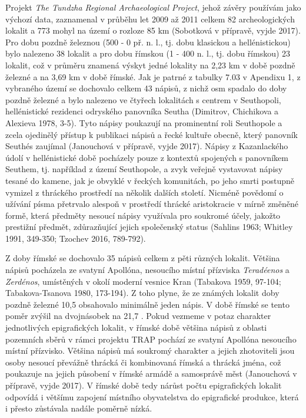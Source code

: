 Projekt {\em The Tundzha Regional Archaeological Project}, jehož závěry používám jako výchozí data, zaznamenal v průběhu let 2009 až 2011 celkem 82 archeologických lokalit a 773 mohyl na území o rozloze 85 km (Sobotková v přípravě, vyjde 2017). Pro dobu pozdně železnou (500 - 0 př. n. l., tj. dobu klasickou a hellénistickou) bylo nalezeno 38 lokalit a pro dobu římskou (1 - 400 n. l., tj. dobu římskou) 23 lokalit, což v průměru znamená výskyt jedné lokality na 2,23 km v době pozdně železné a na 3,69 km v době římské. Jak je patrné z tabulky 7.03 v Apendixu 1, z vybraného území se dochovalo celkem 43 nápisů, z nichž osm spadalo do doby pozdně železné a bylo nalezeno ve čtyřech lokalitách s centrem v Seuthopoli, hellénistické rezidenci odryského panovníka Seutha (Dimitrov, Chichikova a Alexieva 1978, 3-5). Tyto nápisy poukazují na prominentní roli Seuthopole a zcela ojedinělý přístup k publikaci nápisů a řecké kultuře obecně, který panovník Seuthés zaujímal (Janouchová v přípravě, vyjde 2017). Nápisy z Kazanlackého údolí v hellénistické době pocházely pouze z kontextů spojených s panovníkem Seuthem, tj. například z území Seuthopole, a zvyk veřejně vystavovat nápisy tesané do kamene, jak je obvyklé v řeckých komunitách, po jeho smrti postupně vymizel z thráckého prostředí na několik dalších století. Nicméně povědomí o užívání písma přetrvalo alespoň v prostředí thrácké aristokracie v mírně změněné formě, která předměty nesoucí nápisy využívala pro soukromé účely, jakožto prestižní předmět, zdůrazňující jejich společenský status (Sahlins 1963; Whitley 1991, 349-350; Tzochev 2016, 789-792).

Z doby římské se dochovalo 35 nápisů celkem z pěti různých lokalit. Většina nápisů pocházela ze svatyní Apollóna, nesoucího místní přízviska {\em Teradéenos} a {\em Zerdénos}, umístěných v okolí moderní vesnice Kran (Tabakova 1959, 97-104; Tabakova-Tsanova 1980, 173-194). Z toho plyne, že ze známých lokalit doby pozdně železné 10,5  obsahovalo minimálně jeden nápis. V době římské se tento poměr zvýšil na dvojnásobek na 21,7 . Pokud vezmeme v potaz charakter jednotlivých epigrafických lokalit, v římské době většina nápisů z oblasti pozemních sběrů v rámci projektu TRAP pochází ze svatyní Apollóna nesoucího místní přízvisko. Většina nápisů má soukromý charakter a jejich zhotoviteli jsou osoby nesoucí převážně thrácká či kombinovaná římská a thrácká jména, což poukazuje na jejich působení v římské armádě a samosprávě měst (Janouchová v přípravě, vyjde 2017). V římské době tedy nárůst počtu epigrafických lokalit odpovídá i většímu zapojení místního obyvatelstva do epigrafické produkce, která i přesto zůstávala nadále poměrně nízká.


